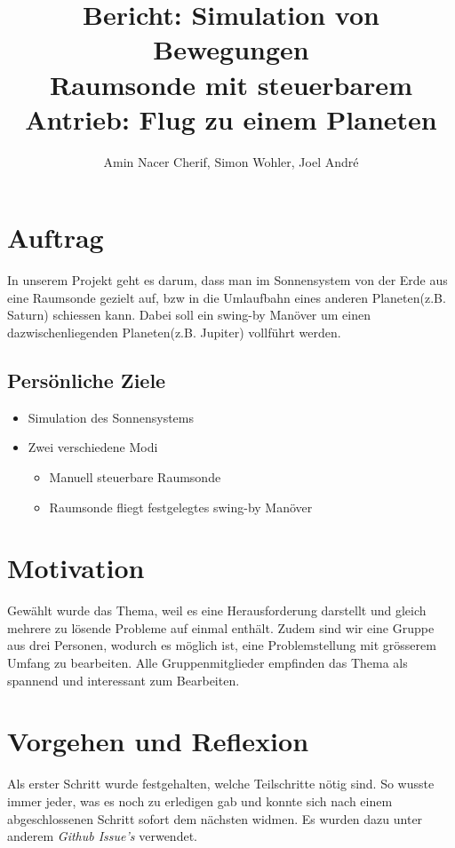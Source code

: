 \documentclass{article}
\title{
	Bericht: Simulation von Bewegungen \\
	\large Raumsonde mit steuerbarem Antrieb: Flug zu einem Planeten}
\author{Amin Nacer Cherif, Simon Wohler, Joel André}
\begin{document}
\maketitle

\section{Auftrag}
In unserem Projekt geht es darum, dass man im Sonnensystem von der Erde aus eine Raumsonde gezielt auf, bzw in die Umlaufbahn eines anderen Planeten(z.B. Saturn) schiessen kann. Dabei soll ein swing-by Manöver um einen dazwischenliegenden Planeten(z.B. Jupiter) vollführt werden.

	\subsection{Persönliche Ziele}
		\begin{itemize} 
			\item Simulation des Sonnensystems
			\item Zwei verschiedene Modi
			\begin{itemize} 
				\item Manuell steuerbare Raumsonde
				\item Raumsonde fliegt festgelegtes swing-by Manöver
			\end{itemize}
		\end{itemize}

\section{Motivation}
Gewählt wurde das Thema, weil es eine Herausforderung darstellt und gleich mehrere zu lösende Probleme auf einmal enthält. Zudem sind wir eine Gruppe aus drei Personen, wodurch es möglich ist, eine Problemstellung mit grösserem Umfang zu bearbeiten. Alle Gruppenmitglieder empfinden das Thema als spannend und interessant zum Bearbeiten.

\section{Vorgehen und Reflexion}
Als erster Schritt wurde festgehalten, welche Teilschritte nötig sind. So wusste immer jeder, was es noch zu erledigen gab und konnte sich nach einem abgeschlossenen Schritt sofort dem nächsten widmen. 
Es wurden dazu unter anderem \textit{Github Issue's} verwendet. 
\end{document}
